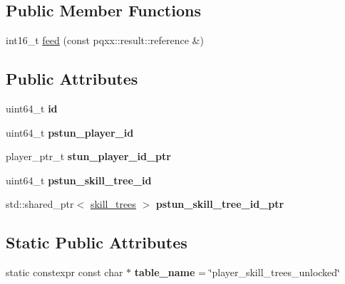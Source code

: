 \subsection*{Public Member Functions}
\begin{DoxyCompactItemize}
\item 
int16\+\_\+t \hyperlink{structmods_1_1orm_1_1player__skill__trees__unlocked_a433aeb4a59fe50b22ffe07593cc70aa5}{feed} (const pqxx\+::result\+::reference \&)
\end{DoxyCompactItemize}
\subsection*{Public Attributes}
\begin{DoxyCompactItemize}
\item 
\mbox{\label{structmods_1_1orm_1_1player__skill__trees__unlocked_a629296c0fe5bc1dea7a34153e131ea8d}} 
uint64\+\_\+t {\bfseries id}
\item 
\mbox{\label{structmods_1_1orm_1_1player__skill__trees__unlocked_ae198e2d48046cb9bb1e104538a5497f4}} 
uint64\+\_\+t {\bfseries pstun\+\_\+player\+\_\+id}
\item 
\mbox{\label{structmods_1_1orm_1_1player__skill__trees__unlocked_ab65d214ed7b898e493feee0d5488fa7c}} 
player\+\_\+ptr\+\_\+t {\bfseries stun\+\_\+player\+\_\+id\+\_\+ptr}
\item 
\mbox{\label{structmods_1_1orm_1_1player__skill__trees__unlocked_a0ee174d34076567d6446ae77d97a2a03}} 
uint64\+\_\+t {\bfseries pstun\+\_\+skill\+\_\+tree\+\_\+id}
\item 
\mbox{\label{structmods_1_1orm_1_1player__skill__trees__unlocked_a9a991dd5bdf40e8cd9d8d36b4317d7f9}} 
std\+::shared\+\_\+ptr$<$ \hyperlink{structmods_1_1orm_1_1skill__trees}{skill\+\_\+trees} $>$ {\bfseries pstun\+\_\+skill\+\_\+tree\+\_\+id\+\_\+ptr}
\end{DoxyCompactItemize}
\subsection*{Static Public Attributes}
\begin{DoxyCompactItemize}
\item 
\mbox{\label{structmods_1_1orm_1_1player__skill__trees__unlocked_a200e9b7026d115140a76a3f8ec0c219a}} 
static constexpr const char $\ast$ {\bfseries table\+\_\+name} = \char`\"{}player\+\_\+skill\+\_\+trees\+\_\+unlocked\char`\"{}
\end{DoxyCompactItemize}


